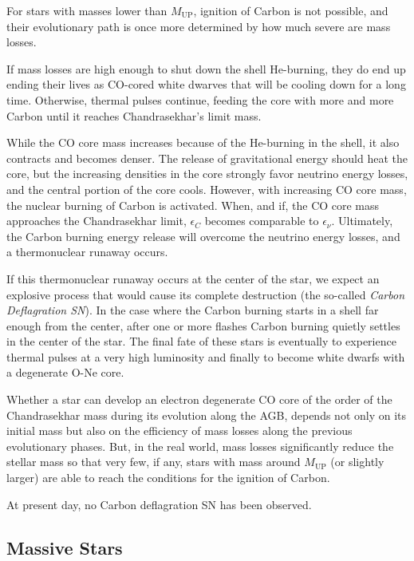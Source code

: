For stars with masses lower than $M_{\text{UP}}$, ignition of Carbon is not possible, and their evolutionary path is once more determined by how much severe are mass losses.
\par If mass losses are high enough to shut down the shell He-burning, they do end up ending their lives as CO-cored white dwarves that will be cooling down for a long time. Otherwise, thermal pulses continue, feeding the core with more and more Carbon until it reaches Chandrasekhar's limit mass.
\par While the CO core mass increases because of the He-burning in the shell, it also contracts and becomes denser. The release of gravitational energy should heat the core, but the increasing densities in the core strongly favor neutrino energy losses, and the central portion of the core cools. However, with increasing CO core mass, the nuclear burning of Carbon is activated. When, and if, the CO core mass approaches the Chandrasekhar limit, $\epsilon_{C}$ becomes comparable to $\epsilon_{\nu}$. Ultimately, the Carbon burning energy release will overcome the neutrino energy losses, and a thermonuclear runaway occurs.
\par If this thermonuclear runaway occurs at the center of the star, we expect an explosive process that would cause its complete destruction (the so-called \emph{Carbon Deflagration SN}). In the case where the Carbon burning starts in a shell far enough from the center, after one or more  flashes Carbon burning quietly settles in the center of the star. The final fate of these stars is eventually to experience thermal pulses at a very high luminosity and finally to become white dwarfs with a degenerate O-Ne core.
\par Whether a star can develop an electron degenerate CO core of the order of the Chandrasekhar mass during its evolution along the AGB, depends not only on its initial mass but also on the efficiency of mass losses along the previous evolutionary phases. But, in the real world, mass losses significantly reduce the stellar mass so that very few, if any, stars with mass around $M_{\text{UP}}$ (or slightly larger) are able to reach the conditions for the ignition of Carbon.
\par At present day, no Carbon deflagration SN has been observed.

\subsection{Massive Stars}

